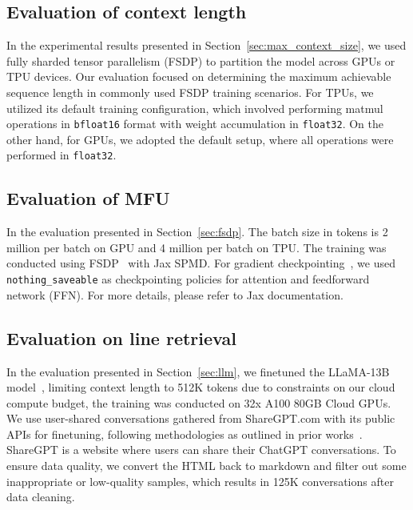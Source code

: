 \documentclass{article}
\begin{document}
\subsection{Evaluation of context length}

In the experimental results presented in Section~\ref{sec:max_context_size}, we used fully sharded tensor parallelism (FSDP) to partition the model across GPUs or TPU devices.
Our evaluation focused on determining the maximum achievable sequence length in commonly used FSDP training scenarios.
For TPUs, we utilized its default training configuration, which involved performing matmul operations in \texttt{bfloat16} format with weight accumulation in \texttt{float32}. On the other hand, for GPUs, we adopted the default setup, where all operations were performed in \texttt{float32}.


\subsection{Evaluation of MFU}

In the evaluation presented in Section~\ref{sec:fsdp}.
The batch size in tokens is 2 million per batch on GPU and 4 million per batch on TPU. The training was conducted using FSDP~\cite{fbFullySharded} with Jax SPMD.
For gradient checkpointing~\citep{chen2016training}, we used \texttt{nothing\_saveable} as checkpointing policies for attention and feedforward network (FFN). For more details, please refer to Jax documentation.

\subsection{Evaluation on line retrieval}

In the evaluation presented in Section~\ref{sec:llm}, we finetuned the LLaMA-13B model~\citep{touvron2023llama}, limiting context length to 512K tokens due to constraints on our cloud compute budget, the training was conducted on 32x A100 80GB Cloud GPUs.
We use user-shared conversations gathered from ShareGPT.com with its public APIs for finetuning, following methodologies as outlined in prior works~\citep{chiang2023vicuna,geng2023koala}. ShareGPT is a website where users can share their ChatGPT conversations. To ensure data quality, we convert the HTML back to markdown and filter out some inappropriate or low-quality samples, which results in 125K conversations after data cleaning.
\end{document}
